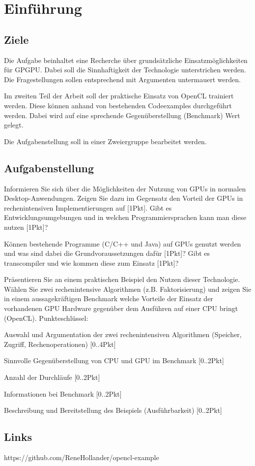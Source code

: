 
\section{Einführung}

\subsection{Ziele}
Die Aufgabe beinhaltet eine Recherche über grundsätzliche Einsatzmöglichkeiten für GPGPU. Dabei soll die Sinnhaftigkeit der Technologie unterstrichen werden. Die Fragestellungen sollen entsprechend mit Argumenten untermauert werden.

Im zweiten Teil der Arbeit soll der praktische Einsatz von OpenCL trainiert werden. Diese können anhand von bestehenden Codeexamples durchgeführt werden. Dabei wird auf eine sprechende Gegenüberstellung (Benchmark) Wert gelegt.

Die Aufgabenstellung soll in einer Zweiergruppe bearbeitet werden.


\subsection{Aufgabenstellung}
Informieren Sie sich über die Möglichkeiten der Nutzung von GPUs in normalen Desktop-Anwendungen. Zeigen Sie dazu im Gegensatz den Vorteil der GPUs in rechenintensiven Implementierungen auf [1Pkt].
Gibt es Entwicklungsumgebungen und in welchen Programmiersprachen kann man diese nutzen [1Pkt]?

Können bestehende Programme (C/C++ und Java) auf GPUs genutzt werden und was sind dabei die Grundvoraussetzungen dafür [1Pkt]? Gibt es transcompiler und wie kommen diese zum Einsatz [1Pkt]?

Präsentieren Sie an einem praktischen Beispiel den Nutzen dieser Technologie. Wählen Sie zwei rechenintensive Algorithmen (z.B. Faktorisierung) und zeigen Sie in einem aussagekräftigen Benchmark welche Vorteile der Einsatz der vorhandenen GPU Hardware gegenüber dem Ausführen auf einer CPU bringt (OpenCL). Punkteschlüssel:

Auswahl und Argumentation der zwei rechenintensiven Algorithmen (Speicher, Zugriff, Rechenoperationen) [0..4Pkt]

Sinnvolle Gegenüberstellung von CPU und GPU im Benchmark [0..2Pkt]

Anzahl der Durchläufe [0..2Pkt]

Informationen bei Benchmark [0..2Pkt]

Beschreibung und Bereitstellung des Beispiels (Ausführbarkeit) [0..2Pkt]

\subsection{Links}
https://github.com/ReneHollander/opencl-example



\clearpage
